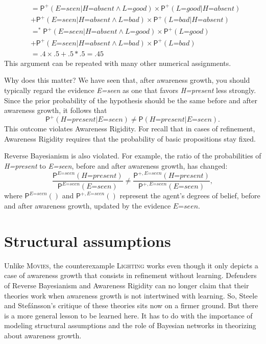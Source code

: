 \documentclass[
  11pt,
  dvipsnames,enabledeprecatedfontcommands]{scrartcl}
\newcommand{\pr}[1]{\ensuremath{\mathsf{P}(#1)}}
\newcommand{\ppr}[2]{\ensuremath{\mathsf{P}^{#1}(#2)}}
\begin{document}
{\begin{align*}
  &= \ppr{+}{\textit{E=seen} \vert \textit{H=absent} \wedge \textit{L=good}}  \times \ppr{+}{\textit{L=good} \vert  \textit{H=absent} }\\ & +\ppr{+}{\textit{E=seen}  \vert \textit{H=absent} \wedge \textit{L=bad}} \times \ppr{+}{\textit{L=bad} \vert  \textit{H=absent}}\\
  &=^* \ppr{+}{\textit{E=seen} \vert \textit{H=absent} \wedge \textit{L=good}}  \times \ppr{+}{\textit{L=good}}\\ & +\ppr{+}{\textit{E=seen}  \vert \textit{H=absent} \wedge \textit{L=bad}} \times \ppr{+}{\textit{L=bad}}\\
  &= .4 \times .5 +.5 *.5 = .45 
  \end{align*} This argument can be repeated with many other numerical
  assignments.}

Why does this matter? We have seen that, after awareness growth, you
should typically regard the evidence \textit{E=seen} as one that favors
\textit{H=present} less strongly. Since the prior probability of the
hypothesis should be the same before and after awareness growth, it
follows that
\[\ppr{+}{\textit{H=present} \vert \textit{E=seen}} \neq \pr{\textit{H=present} \vert \textit{E=seen}}.\]
This outcome violates Awareness Rigidity. For recall that in cases of
refinement, Awareness Rigidity requires that the probability of basic
propositions stay fixed.

Reverse Bayesianism is also violated. For example, the ratio of the
probabilities of \textit{H=present} to \textit{E=seen}, before and after
awareness growth, has changed:
\[\frac{\ppr{\textit{E=seen}}{\textit{H=present}}}{\ppr{ \textit{E=seen}}{\textit{E=seen}}} \neq \frac{\ppr{+, \textit{E=seen}}{\textit{H=present}}}{\ppr{+, \textit{E=seen}}{\textit{E=seen}}},\]
where \(\ppr{\textit{E=seen}}{}\) and \(\ppr{+, \textit{E=seen}}{}\)
represent the agent's degrees of belief, before and after awareness
growth, updated by the evidence \(\textit{E=seen}\).

\hypertarget{structural-assumptions}{%
\section{Structural assumptions}\label{structural-assumptions}}

\label{sec:structural}

Unlike \textsc{Movies}, the counterexample \textsc{Lighting} works even
though it only depicts a case of awareness growth that consists in
refinement without learning. Defenders of Reverse Bayesianism and
Awareness Rigidity can no longer claim that their theories work when
awareness growth is not intertwined with learning. So, Steele and
Stefánsson's critique of these theories sits now on a firmer ground. But
there is a more general lesson to be learned here. It has to do with the
importance of modeling structural assumptions and the role of Bayesian
networks in theorizing about awareness growth.
\end{document}
